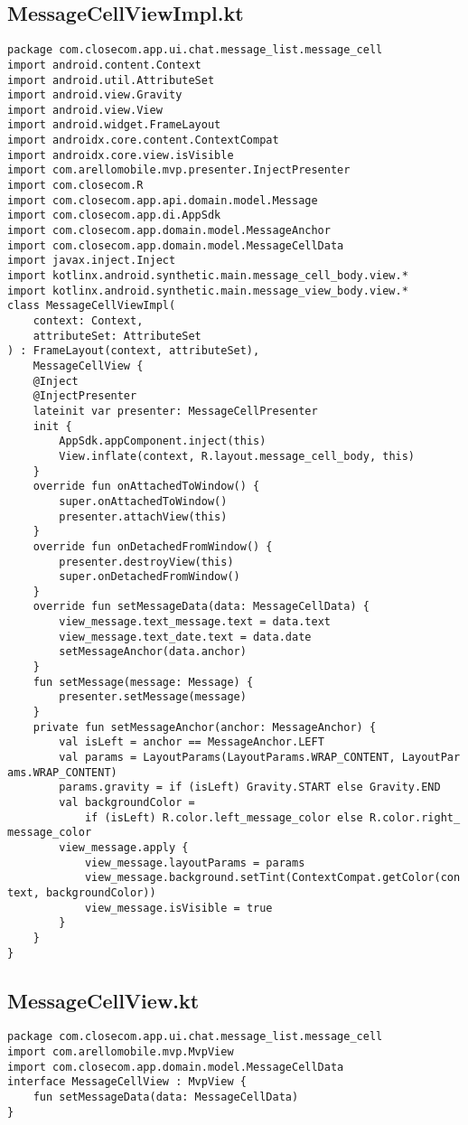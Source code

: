 \documentclass[listing]{espd}
\begin{document}
\subsection{MessageCellViewImpl.kt}
\begin{verbatim}
package com.closecom.app.ui.chat.message_list.message_cell
import android.content.Context
import android.util.AttributeSet
import android.view.Gravity
import android.view.View
import android.widget.FrameLayout
import androidx.core.content.ContextCompat
import androidx.core.view.isVisible
import com.arellomobile.mvp.presenter.InjectPresenter
import com.closecom.R
import com.closecom.app.api.domain.model.Message
import com.closecom.app.di.AppSdk
import com.closecom.app.domain.model.MessageAnchor
import com.closecom.app.domain.model.MessageCellData
import javax.inject.Inject
import kotlinx.android.synthetic.main.message_cell_body.view.*
import kotlinx.android.synthetic.main.message_view_body.view.*
class MessageCellViewImpl(
    context: Context,
    attributeSet: AttributeSet
) : FrameLayout(context, attributeSet),
    MessageCellView {
    @Inject
    @InjectPresenter
    lateinit var presenter: MessageCellPresenter
    init {
        AppSdk.appComponent.inject(this)
        View.inflate(context, R.layout.message_cell_body, this)
    }
    override fun onAttachedToWindow() {
        super.onAttachedToWindow()
        presenter.attachView(this)
    }
    override fun onDetachedFromWindow() {
        presenter.destroyView(this)
        super.onDetachedFromWindow()
    }
    override fun setMessageData(data: MessageCellData) {
        view_message.text_message.text = data.text
        view_message.text_date.text = data.date
        setMessageAnchor(data.anchor)
    }
    fun setMessage(message: Message) {
        presenter.setMessage(message)
    }
    private fun setMessageAnchor(anchor: MessageAnchor) {
        val isLeft = anchor == MessageAnchor.LEFT
        val params = LayoutParams(LayoutParams.WRAP_CONTENT, LayoutPar
ams.WRAP_CONTENT)
        params.gravity = if (isLeft) Gravity.START else Gravity.END
        val backgroundColor =
            if (isLeft) R.color.left_message_color else R.color.right_
message_color
        view_message.apply {
            view_message.layoutParams = params
            view_message.background.setTint(ContextCompat.getColor(con
text, backgroundColor))
            view_message.isVisible = true
        }
    }
}
\end{verbatim}

\subsection{MessageCellView.kt}
\begin{verbatim}
package com.closecom.app.ui.chat.message_list.message_cell
import com.arellomobile.mvp.MvpView
import com.closecom.app.domain.model.MessageCellData
interface MessageCellView : MvpView {
    fun setMessageData(data: MessageCellData)
}
\end{verbatim}
\end{document}
